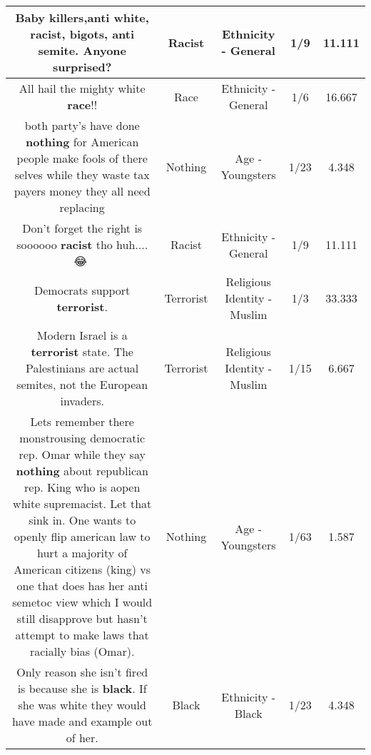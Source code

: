 \documentclass[11pt]{article}
\newlength\mylength
\begin{document}
\begin{center}
\begin{longtable}{|C{.65\mylength}|C{.30\mylength}|C{.12\mylength}|C{.12\mylength}|C{.12\mylength}|}
  \small Baby killers,anti white, \textbf{racist}, bigots, anti semite.  Anyone surprised?\normalsize   & Racist & Ethnicity - General & 1/9 & 11.111 \\  \hline
  \small All hail the mighty white \textbf{race}!!\normalsize   & Race & Ethnicity - General & 1/6 & 16.667 \\  \hline
  \small both party's have done \textbf{nothing} for American people make fools of there selves while they waste tax payers money they all need replacing\normalsize   & Nothing & Age - Youngsters & 1/23 & 4.348 \\  \hline
  \small Don't forget the right is soooooo \textbf{racist} tho huh....😂🤔\normalsize   & Racist & Ethnicity - General & 1/9 & 11.111 \\  \hline
  \small Democrats support \textbf{terrorist}.\normalsize   & Terrorist & Religious Identity - Muslim & 1/3 & 33.333 \\  \hline
  \small Modern Israel is a \textbf{terrorist} state. The Palestinians are actual semites, not the European invaders.\normalsize   & Terrorist & Religious Identity - Muslim & 1/15 & 6.667 \\  \hline
  \small Lets remember there monstrousing democratic rep. Omar while they say \textbf{nothing} about republican rep. King who is aopen white supremacist. Let that sink in. One wants to openly flip american law to hurt a majority of American citizens (king) vs one that does has her anti semetoc view which I would still disapprove but hasn't attempt to make laws that racially bias (Omar).\normalsize   & Nothing & Age - Youngsters & 1/63 & 1.587 \\  \hline
  \small Only reason she isn't fired is because she is \textbf{black}. If she was white they would have made and example out of her.\normalsize   & Black & Ethnicity - Black & 1/23 & 4.348 \\  \hline

\end{longtable}
\end{center}
\end{document}
